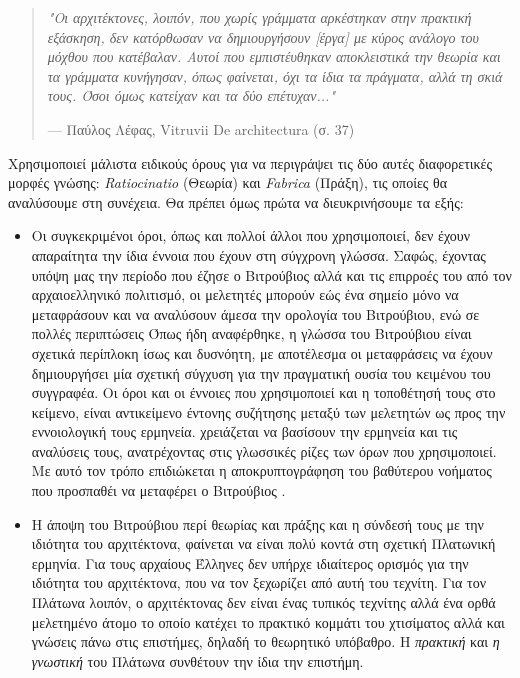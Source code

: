 \begin{quote}
{\itshape "Οι αρχιτέκτονες, λοιπόν, που χωρίς γράμματα αρκέστηκαν στην πρακτική εξάσκηση,  δεν κατόρθωσαν να δημιουργήσουν [έργα] με κύρος ανάλογο του μόχθου που κατέβαλαν. Αυτοί που εμπιστέυθηκαν αποκλειστικά την θεωρία και τα γράμματα κυνήγησαν, όπως φαίνεται, όχι τα ίδια τα πράγματα, αλλά τη σκιά τους. Όσοι όμως κατείχαν και τα δύο επέτυχαν..."}
\begin{flushright}
\footnotesize{--- Παύλος Λέφας, Vitruvii De architectura (σ. 37)}
\end{flushright}
\end{quote}

Χρησιμοποιεί μάλιστα ειδικούς όρους για να περιγράψει τις δύο αυτές διαφορετικές μορφές γνώσης: \emph{Ratiocinatio} (Θεωρία) και \emph{Fabrica} (Πράξη), τις οποίες θα αναλύσουμε στη συνέχεια. Θα πρέπει όμως πρώτα να διευκρινήσουμε τα εξής:

\begin{itemize}
\item Οι συγκεκριμένοι όροι, όπως και πολλοί άλλοι που χρησιμοποιεί, δεν έχουν απαραίτητα την ίδια έννοια που έχουν στη σύγχρονη γλώσσα. Σαφώς, έχοντας υπόψη μας την περίοδο που έζησε ο Βιτρούβιος αλλά και τις επιρροές του από τον αρχαιοελληνικό πολιτισμό, οι μελετητές μπορούν εώς ένα σημείο μόνο να μεταφράσουν και να αναλύσουν άμεσα την ορολογία του Βιτρούβιου, ενώ σε πολλές περιπτώσεις \sidenote%
    {Όπως ήδη αναφέρθηκε, η γλώσσα του Βιτρούβιου είναι σχετικά περίπλοκη ίσως και δυσνόητη, με αποτέλεσμα οι μεταφράσεις να έχουν δημιουργήσει μία σχετική σύγχυση για την πραγματική ουσία του κειμένου του συγγραφέα. Οι όροι και οι έννοιες που χρησιμοποιεί και η τοποθέτησή τους στο κείμενο, είναι αντικείμενο έντονης συζήτησης μεταξύ των μελετητών ως προς την εννοιολογική τους ερμηνεία.}
χρειάζεται να βασίσουν την ερμηνεία και τις αναλύσεις τους, ανατρέχοντας στις γλωσσικές ρίζες των όρων που χρησιμοποιεί. Με αυτό τον τρόπο επιδιώκεται η αποκρυπτογράφηση του βαθύτερου νοήματος που προσπαθέι να μεταφέρει ο Βιτρούβιος \cite{graham-education}.
\item Η άποψη του Βιτρούβιου περί θεωρίας και πράξης και η σύνδεσή τους με την ιδιότητα του αρχιτέκτονα, φαίνεται να είναι πολύ κοντά στη σχετική Πλατωνική ερμηνία. Για τους αρχαίους Έλληνες δεν υπήρχε ιδιαίτερος ορισμός για την ιδιότητα του αρχιτέκτονα, που να τον ξεχωρίζει από αυτή του τεχνίτη. Για τον Πλάτωνα λοιπόν, ο αρχιτέκτονας δεν είναι ένας τυπικός τεχνίτης αλλά ένα ορθά μελετημένο άτομο το οποίο κατέχει το πρακτικό κομμάτι του χτισίματος αλλά και γνώσεις πάνω στις επιστήμες, δηλαδή το θεωρητικό υπόβαθρο. Η \emph{πρακτική} και \emph{η γνωστική} του Πλάτωνα συνθέτουν την ίδια την επιστήμη. \cite{graham-education}
\end{itemize}

